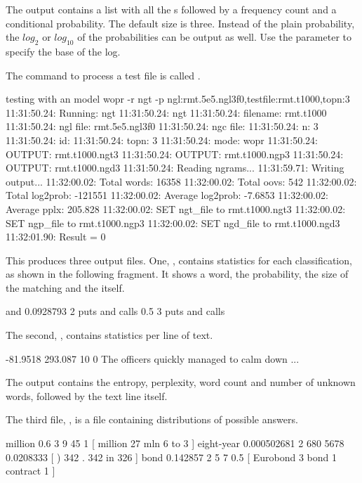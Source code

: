 \documentclass[a4paper,10pt,twoside]{report}
\begin{document}
The output contains a list with all the \ngram{}s followed by a
frequency count and a conditional probability. The default \ngram{}
size is three. Instead of the plain probability, the $log_2$ or
$log_{10}$ of the probabilities can be output as well. Use the
 parameter to specify the base of the log.

The command to process a test file is called .

\begin{bash}{testing with an \ngram{} model}
wopr -r ngt -p ngl:rmt.5e5.ngl3f0,testfile:rmt.t1000,topn:3
11:31:50.24: Running: ngt
11:31:50.24: ngt
11:31:50.24:  filename:  rmt.t1000
11:31:50.24:  ngl file:  rmt.5e5.ngl3f0
11:31:50.24:  ngc file:    
11:31:50.24:  n:         3
11:31:50.24:  id:
11:31:50.24:  topn:      3
11:31:50.24:  mode:      wopr
11:31:50.24:  OUTPUT:    rmt.t1000.ngt3
11:31:50.24:  OUTPUT:    rmt.t1000.ngp3
11:31:50.24:  OUTPUT:    rmt.t1000.ngd3
11:31:50.24: Reading ngrams...
11:31:59.71: Writing output...
11:32:00.02: Total words: 16358
11:32:00.02: Total oovs: 542
11:32:00.02: Total log2prob: -121551
11:32:00.02: Average log2prob: -7.6853
11:32:00.02: Average pplx: 205.828
11:32:00.02: SET ngt_file to rmt.t1000.ngt3
11:32:00.02: SET ngp_file to rmt.t1000.ngp3
11:32:00.02: SET ngd_file to rmt.t1000.ngd3
11:32:01.90: Result = 0
\end{bash}

This produces three output files. One, , contains
statistics for each classification, as shown in the following
fragment. It shows a word, the \ngram{} probability, the size of the
matching \ngram{} and the \ngram{} itself.

\begin{wout}{}
and 0.0928793 2 puts and
calls 0.5 3 puts and calls
\end{wout}

The second, , contains statistics per line of text.

\begin{wout}{}
-81.9518 293.087 10 0 The officers quickly managed to calm down ...
\end{wout}

The output contains the entropy, perplexity, word count and number of
unknown words, followed by the text line itself.

The third file, , is a file containing
distributions of possible answers.

\begin{wout}{}
million 0.6 3 9 45 1 [ million 27 mln 6 to 3 ]
eight-year 0.000502681 2 680 5678 0.0208333 [ ) 342 . 342 in 326 ]
bond 0.142857 2 5 7 0.5 [ Eurobond 3 bond 1 contract 1 ]
\end{wout}
\end{document}

